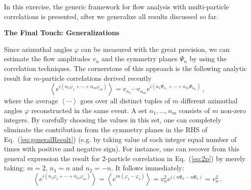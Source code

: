 \documentclass[12pt]{article}
\begin{document}
In this exercise, the generic framework for flow analysis with multi-particle correlations is presented, after we generalize all results discussed so far.


\begin{center}
\large{\bf{The Final Touch: Generalizations}}\\
\end{center}

\noindent Since azimuthal angles $\varphi$ can be measured with the great precision, we can estimate the flow amplitudes $v_n$ and the symmetry planes $\Psi_n$ by using the correlation techniques. The cornerstone of this approach is the following analytic result for $m$-particle correlations derived recently~\cite{Bhalerao:2011yg}
%
\begin{equation}
\left<e^{i(n_1\varphi_1+\cdots+n_m\varphi_m)}\right> = v_{n_1}\cdots v_{n_m}e^{i(n_1\Psi_{n_1}+\cdots+n_m\Psi_{n_m})}\,,
\label{eq:generalResult}
\end{equation}
%
where the average $\left<\cdots\right>$ goes over all distinct tuples of $m$ different azimuthal angles $\varphi$ reconstructed in the same event. A set $n_1,\ldots, n_m$ consists of $m$ non-zero integers. By carefully choosing the values in this set, one can completely eliminate the contribution from the symmetry planes in the RHS of Eq.~(\ref{eq:generalResult}) (e.g. by taking value of each integer equal number of times with positive and negative sign). For instance, one can recover from this general expression the result for 2-particle correlation in Eq.~(\ref{eq:2p}) by merely taking: $m=2$, $n_1=n$ and $n_2=-n$. It follows immediately:
%
\begin{equation}
\left<e^{i(n_1\varphi_1+\cdots+n_m\varphi_m)}\right> = \left<e^{in(\varphi_1-\varphi_2)}\right> = 
v_{n}^2 e^{i(n\Psi_{n}-n\Psi_{n})} = 
v_{n}^2\,.
\label{eq:cross-check}
\end{equation}
%
\end{document}
